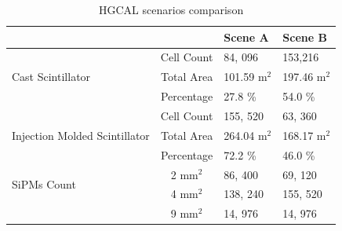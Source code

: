 \begin{table}[!ht]
  \centering
  \caption{\gls{HGCAL} scenarios comparison}
  \begin{tabular}{p{1.5in}cll}%
    \toprule
                                                   &                    & Scene A                & Scene B                \\
    \midrule
    \multirow{3}{=}{Cast Scintillator}             & Cell Count         & 84, 096                & 153,216                \\
                                                   & Total Area         & 101.59 \(\text{m}^2 \) & 197.46 \(\text{m}^2 \) \\
                                                   & Percentage         & 27.8 \%                & 54.0 \%                \\
    \cmidrule(lr){2-4}
    \multirow{3}{=}{Injection Molded Scintillator} & Cell Count         & 155, 520               & 63, 360                \\
                                                   & Total Area         & 264.04 \(\text{m}^2 \) & 168.17 \(\text{m}^2 \) \\
                                                   & Percentage         & 72.2 \%                & 46.0 \%                \\
    \cmidrule(lr){2-4}
    \multirow{2}{=}{SiPMs Count}                   & 2 \(\text{mm}^2 \) & 86, 400                & 69, 120                \\
                                                   & 4 \(\text{mm}^2 \) & 138, 240               & 155, 520               \\
                                                   & 9 \(\text{mm}^2 \) & 14, 976                & 14, 976                \\
    \bottomrule
  \end{tabular}
\end{table}